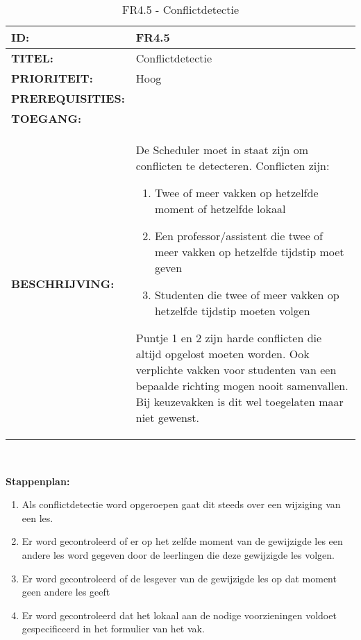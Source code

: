         
\noindent\begin{table}[H]
            \begin{tabular}{l | p{10cm}}
                \textbf{ID:} & FR4.5 \\ \hline
                \textbf{TITEL:} & Conflictdetectie\\ \hline
                \textbf{PRIORITEIT:} & Hoog \\ \hline
                \textbf{PREREQUISITIES:} & \\ \hline
                \textbf{TOEGANG:} &  \\ \hline
                \textbf{BESCHRIJVING:} & De Scheduler moet in staat zijn om conflicten te detecteren. Conflicten zijn: 
                \begin{enumerate}
                \item Twee of meer vakken op hetzelfde moment of hetzelfde lokaal
                \item Een professor/assistent  die twee of meer vakken op hetzelfde tijdstip moet geven 
                \item Studenten die twee of meer vakken op hetzelfde tijdstip moeten volgen
                \end{enumerate}
                Puntje 1 en 2 zijn harde conflicten die altijd opgelost moeten worden. Ook verplichte vakken voor studenten van een bepaalde richting mogen nooit samenvallen. Bij keuzevakken is dit wel toegelaten maar niet gewenst.\\
            \end{tabular}\\
            \caption{FR4.5 - Conflictdetectie}
            \label{tab:FR4.5 - Conflictdetectie}
        \end{table}
        
\textbf{Stappenplan:}
	\begin{enumerate}
	\item Als conflictdetectie word opgeroepen gaat dit steeds over een wijziging van een les.
	\item Er word gecontroleerd of er op het zelfde moment van de gewijzigde les een andere les word gegeven door de leerlingen die deze gewijzigde les volgen.
	\item Er word gecontroleerd of de lesgever van de gewijzigde les op dat moment geen andere les geeft
	\item Er word gecontroleerd dat het lokaal aan de nodige voorzieningen voldoet gespecificeerd in het formulier van het vak. 
	\end{enumerate}

\clearpage